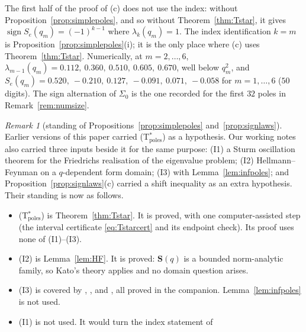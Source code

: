 \documentclass[11pt]{article}
\theoremstyle{plain}
\theoremstyle{definition}
\theoremstyle{remark}
\newtheorem{remark}[theorem]{Remark}
\begin{document}
\noindent The first half of the proof of (c) does not use the index: without
Proposition~\ref{prop:simplepoles}, and so without Theorem~\ref{thm:Tstar}, it gives
$\operatorname{sign}S_e(q_m)=(-1)^{k-1}$ where $\lambda_k(q_m)=1$. The index identification $k=m$ is
Proposition~\ref{prop:simplepoles}\textup{(i)}; it is the only place where (c) uses
Theorem~\ref{thm:Tstar}. Numerically, at
$m=2,\dots,6$, $\lambda_{m-1}(q_m)=0.112,\ 0.360,\ 0.510,\ 0.605,\ 0.670$, well below $q_m^2$, and
$S_e(q_m)=0.520,\ -0.210,\ 0.127,\ -0.091,\ 0.071,\ -0.058$ for $m=1,\dots,6$ ($50$ digits). The
sign alternation of $\Sigma_0$ is the one recorded for the first $32$ poles in
Remark~\ref{rem:numsize}.

\begin{remark}[standing of Propositions~\ref{prop:simplepoles} and~\ref{prop:signlaws}]\label{rem:spectralstanding}
Earlier versions of this paper carried \textup{(T$^\ast_{\mathrm{poles}}$)} as a hypothesis. Our
working notes also carried three inputs beside it for the same purpose: \textup{(I1)} a Sturm
oscillation theorem for the Friedrichs realisation of the eigenvalue problem; \textup{(I2)}
Hellmann--Feynman on a $q$-dependent form domain; \textup{(I3)}
{\cite[Proposition \textup{prop:qtrig}]{Bonfioli2026bA}} with Lemma~\ref{lem:infpoles}; and
Proposition~\ref{prop:signlaws}\textup{(c)} carried a shift inequality as an extra hypothesis. Their
standing is now as follows.
\begin{itemize}[leftmargin=1.5em,itemsep=0.1em,topsep=0.2em]
\item \textup{(T$^\ast_{\mathrm{poles}}$)} is Theorem~\ref{thm:Tstar}. It is proved, with one
computer-assisted step (the interval certificate \eqref{eq:Tstarcert} and its endpoint check). Its
proof uses none of \textup{(I1)}--\textup{(I3)}.
\item \textup{(I2)} is Lemma~\ref{lem:HF}. It is proved: $\mathbf S(q)$ is a bounded norm-analytic
family, so Kato's theory applies and no domain question arises.
\item \textup{(I3)} is covered by {\cite[Proposition \textup{prop:qtrig}]{Bonfioli2026bA}},
{\cite[Theorem ``the travel determinant'', \textup{thm:fredholm}]{Bonfioli2026bA}},
{\cite[Corollary ``the travel poles are Hahn--Exton zeros'', \textup{cor:qbessel}]{Bonfioli2026bA}}
and {\cite[Proposition ``infinitely many travel poles, without $T_2$'', \textup{prop:infpolesalt}]{Bonfioli2026bA}},
all proved in the companion. Lemma~\ref{lem:infpoles} is not used.
\item \textup{(I1)} is not used. It would turn the index statement of

\end{itemize}
\end{remark}
\end{document}
